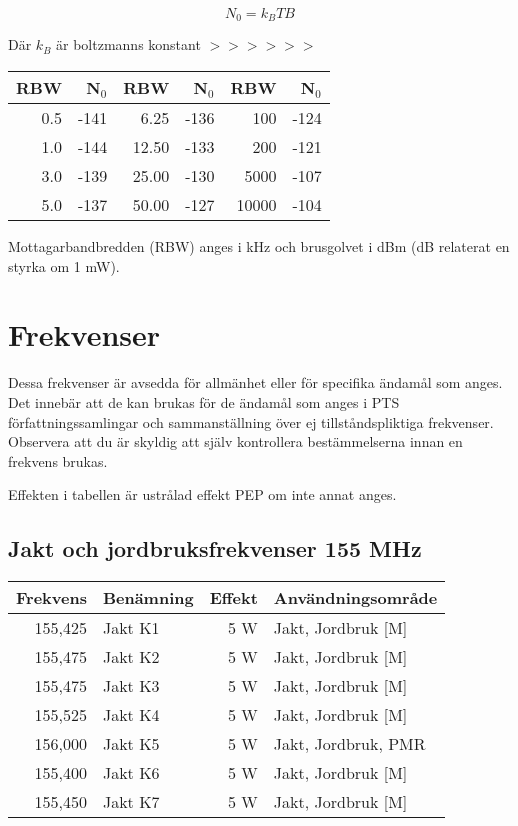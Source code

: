 \documentclass[10pt,swedish,a4paper,twoside]{article}
\begin{document}
$$N_0=k_BTB$$

Där $k_B$ är boltzmanns konstant $>>>>>>$

\begin{center}
\begin{tabular}{rr|rr|rr}
	\textbf{RBW} & \textbf{N$_0$} & \textbf{RBW} & \textbf{N$_0$} & \textbf{RBW} & \textbf{N$_0$} \\ \hline
	         0.5 &           -141 &         6.25 &           -136 &          100 &           -124 \\
	         1.0 &           -144 &        12.50 &           -133 &          200 &           -121 \\
	         3.0 &           -139 &        25.00 &           -130 &         5000 &           -107 \\
	         5.0 &           -137 &        50.00 &           -127 &        10000 &           -104
\end{tabular}
\end{center}

Mottagarbandbredden (RBW) anges i kHz och brusgolvet i dBm (dB relaterat en styrka om 1 mW).


\section{Frekvenser}

Dessa frekvenser är avsedda för allmänhet eller för specifika ända\-mål som anges. Det innebär att de kan brukas för de ändamål som anges i PTS för\-fatt\-nings\-sam\-ling\-ar och sammanställning över ej tillståndspliktiga frekvenser. Observera att du är skyldig att själv kontrollera bestämmelserna innan en frekvens brukas.

Effekten i tabellen är ustrålad effekt PEP om inte annat anges.

\subsection{Jakt och jordbruksfrekvenser 155 MHz}
\begin{tabular}{rlrl}
	\textbf{Frekvens} & \textbf{Benämning} & \textbf{Effekt} & \textbf{Användningsområde} \\ \hline
	          155,425 & Jakt K1            &             5 W & Jakt, Jordbruk [M]         \\
	          155,475 & Jakt K2            &             5 W & Jakt, Jordbruk [M]         \\
	          155,475 & Jakt K3            &             5 W & Jakt, Jordbruk [M]         \\
	          155,525 & Jakt K4            &             5 W & Jakt, Jordbruk [M]         \\
	          156,000 & Jakt K5            &             5 W & Jakt, Jordbruk, PMR        \\
	          155,400 & Jakt K6            &             5 W & Jakt, Jordbruk [M]         \\
	          155,450 & Jakt K7            &             5 W & Jakt, Jordbruk [M]
\end{tabular}
\end{document}
